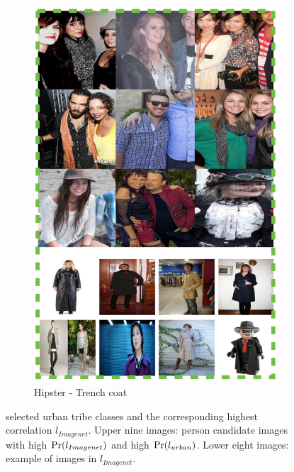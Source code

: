 \documentclass[10pt,twocolumn,letterpaper]{article}
\begin{document}
\begin{figure}[!t]
\begin{center}
\begin{subfigure}[b]{0.2\textwidth}
                \includegraphics[width=\textwidth]{feature4}
                \caption{Hipster - Trench coat}
                \label{feature4}
        \end{subfigure}
\end{center}
\caption{selected urban tribe classes and the corresponding highest correlation $l_{Imagenet}$. Upper nine images: person candidate images with high $\textup{Pr}(l_{Imagenet})$ and high  $\textup{Pr}(l_{urban})$. Lower eight images: example of images in $l_{Imagenet}$.}
\label{features}
\end{figure}
\end{document}
